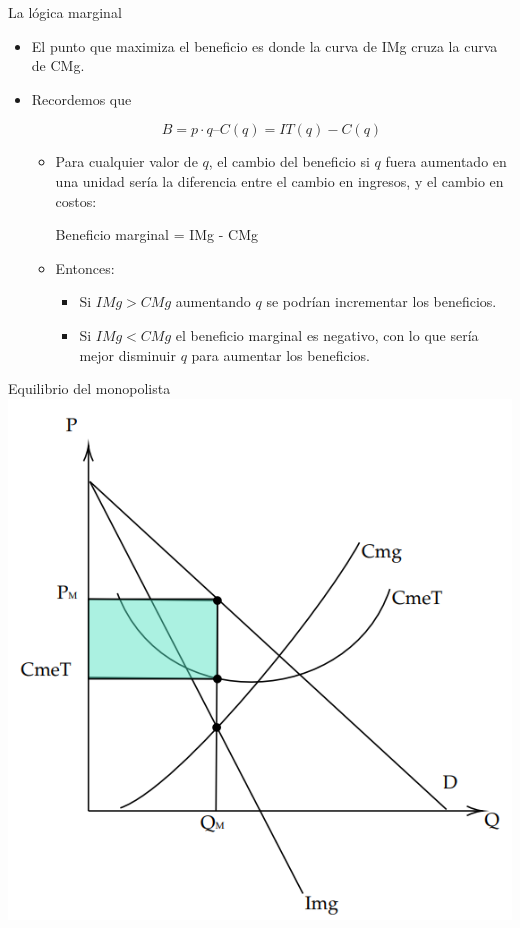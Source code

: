 \documentclass{beamer}
\begin{document}
\begin{frame}{La lógica marginal}
    \begin{itemize}
        \item El punto que maximiza el beneficio es donde la curva de IMg cruza la curva de CMg.
        \item Recordemos que

        \[ B = p \cdot q – C(q) = IT(q) - C(q)\]
        \begin{itemize}
            \item Para cualquier valor de $q$, el cambio del beneficio si $q$ fuera aumentado en una unidad sería la diferencia entre el cambio en ingresos, y el cambio en costos:
            
            \begin{center} 
                Beneficio marginal = IMg - CMg 
            \end{center}

            \item Entonces:
            \begin{itemize}
                \item Si $IMg > CMg$ aumentando $q$ se podrían incrementar los beneficios.
                \item Si $IMg < CMg$ el beneficio marginal es negativo, con lo que sería mejor disminuir $q$ para aumentar los beneficios.
            \end{itemize}
        \end{itemize}
    \end{itemize}
\end{frame}

\begin{frame}{Equilibrio del monopolista}
    \centering
    \includegraphics[scale=0.6]{../Figures/C22.5.png}
\end{frame}
\end{document}
